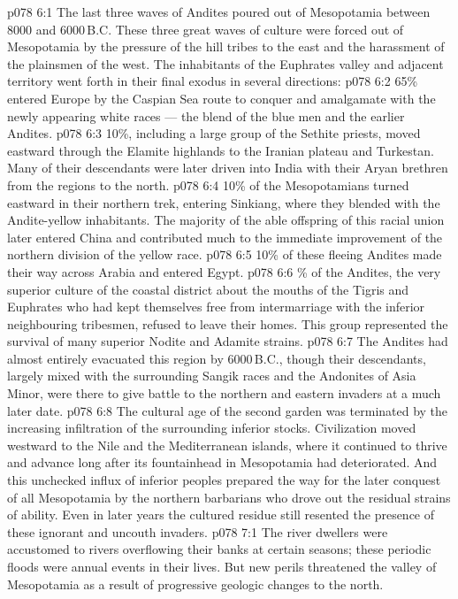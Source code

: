 \vs p078 6:1 The last three waves of Andites poured out of Mesopotamia between 8000 and 6000\,B.C. These three great waves of culture were forced out of Mesopotamia by the pressure of the hill tribes to the east and the harassment of the plainsmen of the west. The inhabitants of the Euphrates valley and adjacent territory went forth in their final exodus in several directions:
\vs p078 6:2 65\% entered Europe by the Caspian Sea route to conquer and amalgamate with the newly appearing white races --- the blend of the blue men and the earlier Andites.
\vs p078 6:3 10\%, including a large group of the Sethite priests, moved eastward through the Elamite highlands to the Iranian plateau and Turkestan. Many of their descendants were later driven into India with their Aryan brethren from the regions to the north.
\vs p078 6:4 10\% of the Mesopotamians turned eastward in their northern trek, entering Sinkiang, where they blended with the Andite\hyp{}yellow inhabitants. The majority of the able offspring of this racial union later entered China and contributed much to the immediate improvement of the northern division of the yellow race.
\vs p078 6:5 10\% of these fleeing Andites made their way across Arabia and entered Egypt.
\vs p078 6:6 \% of the Andites, the very superior culture of the coastal district about the mouths of the Tigris and Euphrates who had kept themselves free from intermarriage with the inferior neighbouring tribesmen, refused to leave their homes. This group represented the survival of many superior Nodite and Adamite strains.
\vs p078 6:7 \pc The Andites had almost entirely evacuated this region by 6000\,B.C., though their descendants, largely mixed with the surrounding Sangik races and the Andonites of Asia Minor, were there to give battle to the northern and eastern invaders at a much later date.
\vs p078 6:8 The cultural age of the second garden was terminated by the increasing infiltration of the surrounding inferior stocks. Civilization moved westward to the Nile and the Mediterranean islands, where it continued to thrive and advance long after its fountainhead in Mesopotamia had deteriorated. And this unchecked influx of inferior peoples prepared the way for the later conquest of all Mesopotamia by the northern barbarians who drove out the residual strains of ability. Even in later years the cultured residue still resented the presence of these ignorant and uncouth invaders.
\vs p078 7:1 The river dwellers were accustomed to rivers overflowing their banks at certain seasons; these periodic floods were annual events in their lives. But new perils threatened the valley of Mesopotamia as a result of progressive geologic changes to the north.
